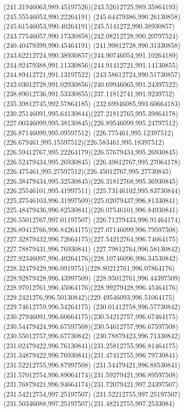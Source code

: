{    \curveto(241.31946063,989.45197526)(243.52612725,989.35864193)(245.55546053,990.22264191)
    \curveto(245.64479386,990.26130858)(245.61546053,990.40264191)(245.5141272,990.38930857)
    \curveto(243.77546057,990.17330858)(242.08212728,990.20797524)(240.40479399,990.45464191)
    \curveto(241.99812728,990.31330858)(243.62212724,990.38930857)(244.90746054,991.10264189)
    \curveto(244.92479388,991.11330856)(244.91412721,991.14130855)(244.89412721,991.13197522)
    \curveto(243.58612724,990.51730857)(242.03012728,991.02930856)(240.69946065,991.24397522)
    \curveto(238.89012736,991.53330855)(237.11812741,991.9239752)(235.39812745,992.57864185)
    \curveto(232.69946085,993.60664183)(230.25146091,995.64130844)(227.21812765,995.39864178)
    \curveto(227.00346099,995.38130845)(226.89546099,995.24797512)(226.87146099,995.09597512)
    \curveto(226.775461,995.12397512)(226.679461,995.15597512)(226.583461,995.18397512)
    \curveto(226.59412767,995.22264179)(226.57679434,995.26930845)(226.52479434,995.26930845)
    \curveto(226.49812767,995.27064178)(226.475461,995.27597512)(226.45012767,995.27730845)
    \curveto(226.38479434,995.32530845)(226.31812768,995.36930845)(226.25546101,995.41997511)
    \curveto(225.73146102,995.83730844)(225.37546103,996.31997509)(225.02079437,996.81330841)
    \curveto(225.48479436,996.82530841)(226.07546101,996.84930841)(226.55012767,997.01197507)
    \curveto(226.71279433,996.91464174)(226.89412766,996.84264175)(227.07146099,996.79597508)
    \curveto(227.32879432,996.72664175)(227.54212764,996.74664175)(227.78879431,996.76930841)
    \curveto(227.79812764,996.58130842)(227.92346097,996.40264176)(228.10746096,996.34530842)
    \curveto(228.32479429,996.0919751)(228.80212761,996.07864176)(228.92879428,996.43997509)
    \curveto(228.95012761,996.44397509)(228.97012761,996.45064176)(228.99279428,996.45464176)
    \curveto(229.2421276,996.50130842)(229.49546093,996.51064175)(229.74612759,996.54264175)
    \curveto(230.01412758,996.57730842)(230.27946091,996.60664175)(230.54212757,996.67464175)
    \curveto(230.54479424,996.67597508)(230.54612757,996.67597508)(230.55012757,996.67730842)
    \curveto(230.78879423,996.71330842)(231.02479422,996.76130841)(231.25812755,996.81464175)
    \curveto(231.34879422,996.76930841)(231.47412755,996.79730841)(231.52212755,996.87997508)
    \curveto(231.54479421,996.88530841)(231.57012754,996.89064174)(231.59279421,996.89597508)
    \curveto(231.76879421,996.94664174)(231.72079421,997.24397507)(231.54212754,997.25197507)
    \curveto(231.52212755,997.25197507)(231.50346088,997.25197507)(231.48212755,997.2533084)
}
